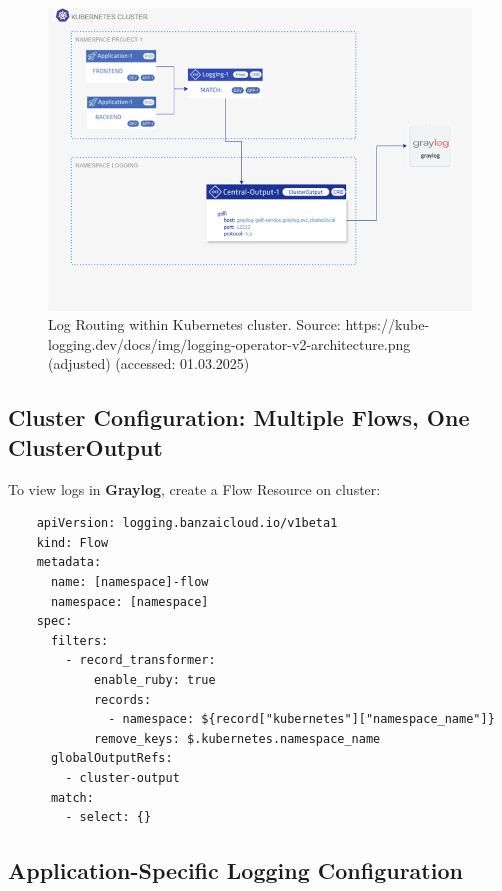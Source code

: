 \documentclass[../main.tex]{subfiles}
\begin{document}
\begin{figure}[h]
        \centering
        \includegraphics[scale=0.9]{img/3-background/centralized_logging/flows_output.png}
        \caption{Log Routing within Kubernetes cluster. Source: https://kube-logging.dev/docs/img/logging-operator-v2-architecture.png (adjusted) (accessed: 01.03.2025) }
        \label{fig:flows_output}
\end{figure}

\subsection{Cluster Configuration: Multiple Flows, One ClusterOutput}

To view logs in \textbf{Graylog}, create a Flow Resource on cluster:

\begin{verbatim}
    apiVersion: logging.banzaicloud.io/v1beta1
    kind: Flow
    metadata:
      name: [namespace]-flow
      namespace: [namespace]
    spec:
      filters:
        - record_transformer:
            enable_ruby: true
            records:
              - namespace: ${record["kubernetes"]["namespace_name"]}
            remove_keys: $.kubernetes.namespace_name
      globalOutputRefs:
        - cluster-output
      match:
        - select: {}
\end{verbatim}

\subsection{Application-Specific Logging Configuration}
\end{document}
